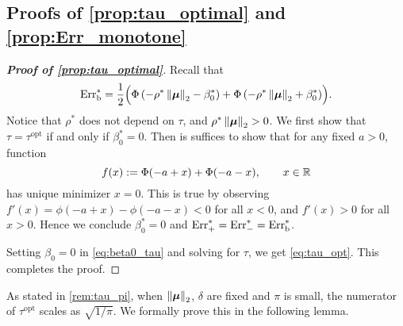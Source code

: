 \subsection{Proofs of \cref{prop:tau_optimal} and \ref{prop:Err_monotone}}
\label{subsec:tau_optimal}

\begin{proof}[\textbf{Proof of \cref{prop:tau_optimal}}]
    Recall that
    \begin{equation*}
        \mathrm{Err}_\mathrm{b}^* = \frac12 \Bigl( 
        \Phi\left(- \rho^* \left\|{\text{\boldmath $\mu$}}\right\|_2 - \beta_0^* \right) + \Phi\left(- \rho^* \left\|{\text{\boldmath $\mu$}}\right\|_2  + \beta_0^* \right)
        \Bigr).
    \end{equation*}
    Notice that $\rho^*$ does not depend on $\tau$, and $\rho^*\left\|{\text{\boldmath $\mu$}}\right\|_2 > 0$. We first show that $\tau = \tau^\mathrm{opt}$ if and only if $\beta_0^* = 0$. Then is suffices to show that for any fixed $a > 0$, function
    \begin{equation*}
        f(x) := \Phi(-a + x) + \Phi(-a - x), \qquad x \in \mathbb{R}
    \end{equation*}
    has unique minimizer $x = 0$. This is true by observing $f'(x) = \phi(-a + x) - \phi(-a - x) < 0$ for all $x < 0$, and $f'(x) > 0$ for all $x > 0$. Hence we conclude $\beta_0^* = 0$ and $\mathrm{Err}_+^* = \mathrm{Err}_-^* = \mathrm{Err}_\mathrm{b}^*$.

    Setting $\beta_0 = 0$ in \cref{eq:beta0_tau} and solving for $\tau$, we get \cref{eq:tau_opt}. This completes the proof.
\end{proof}

As stated in \cref{rem:tau_pi}, when $\left\|{\text{\boldmath $\mu$}}\right\|_2$, $\delta$ are fixed and $\pi$ is small, the numerator of $\tau^\mathrm{opt}$ scales as $\sqrt{1/\pi}$. We formally prove this in the following lemma.

